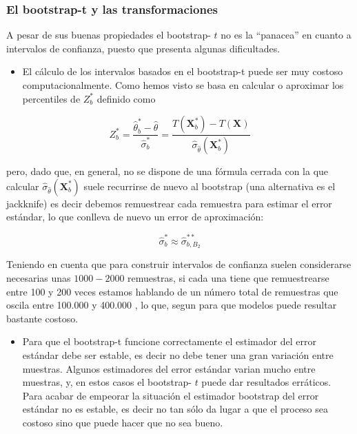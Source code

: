 \documentclass[
]{article}
\providecommand{\tightlist}{%
  \setlength{\itemsep}{0pt}\setlength{\parskip}{0pt}}
\begin{document}
\subsubsection{El bootstrap-t y las transformaciones}\label{el-bootstrap-t-y-las-transformaciones}

A pesar de sus buenas propiedades el bootstrap- \(t\) no es la ``panacea'' en cuanto a intervalos de confianza, puesto que presenta algunas dificultades.

\begin{itemize}
\tightlist
\item
  El cálculo de los intervalos basados en el bootstrap-t puede ser muy costoso computacionalmente. Como hemos visto se basa en calcular o aproximar los percentiles de \(Z_{b}^{*}\) definido como
\end{itemize}

\[
Z_{b}^{*}=\frac{\hat{\theta}_{b}^{*}-\hat{\theta}}{\widehat{\sigma}_{b}^{*}}=\frac{T\left(\mathbf{X}_{b}^{*}\right)-T(\mathbf{X})}{\widehat{\sigma}_{\hat{\theta}}\left(\mathbf{X}_{b}^{*}\right)}
\]

pero, dado que, en general, no se dispone de una fórmula cerrada con la que calcular \(\widehat{\sigma}_{\hat{\theta}}\left(\mathbf{X}_{b}^{*}\right)\) suele recurrirse de nuevo al bootstrap (una alternativa es el jackknife) es decir debemos remuestrear cada remuestra para estimar el error estándar, lo que conlleva de nuevo un error de aproximación:

\[
\widehat{\sigma}_{b}^{*} \approx \widehat{\sigma}_{b, B_{2}}^{* *}
\]

Teniendo en cuenta que para construir intervalos de confianza suelen considerarse necesarias unas \(1000-2000\) remuestras, si cada una tiene que remuestrearse entre 100 y 200 veces estamos hablando de
un número total de remuestras que oscila entre 100.000 y 400.000 , lo que, segun para que modelos puede resultar bastante costoso.

\begin{itemize}
\tightlist
\item
  Para que el bootstrap-t funcione correctamente el estimador del error estándar debe ser estable, es decir no debe tener una gran variación entre muestras. Algunos estimadores del error estándar varian mucho entre muestras, y, en estos casos el bootstrap- \(t\) puede dar resultados erráticos. Para acabar de empeorar la situación el estimador bootstrap del error estándar no es estable, es decir no tan sólo da lugar a que el proceso sea costoso sino que puede hacer que no sea bueno.
\end{itemize}
\end{document}
